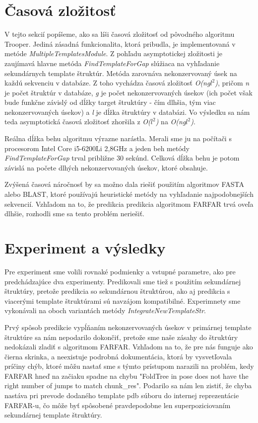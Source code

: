 \section{Časová zložitosť} 
V tejto sekcií popíšeme, ako sa líši časová zložitosť od pôvodného algoritmu Trooper. Jediná zásadná funkcionalita, ktorá pribudla, je implementovaná v metóde \textit{MultipleTemplatesModule}.
Z pohľadu asymptotickej zložitosti je zaujímavá hlavne metóda  \textit{FindTemplateForGap} slúžiaca na vyhľadanie sekundárnych template štruktúr. Metóda zarovnáva nekonzervovaný úsek na každú sekvenciu v databáze. Z toho vychádza časová zložitosť \textit{O(ng$l^2$)}, pričom \textit{n} je počet štruktúr v databáze, \textit{g} je počet nekonzervovaných úsekov (ich počet však bude funkčne závislý od dĺžky target štruktúry - čím dlhšia, tým viac nekonzervovaných úsekov)  a \textit{l} je dĺžka štruktúry v databázi. Vo výsledku sa nám teda asymptotická časová zložitosť zhoršila z \textit{O($l^2$)} na \textit{O(ng$l^2$)}.


\indent Reálna dĺžka behu algoritmu výrazne narástla. Merali sme ju na počítači s procesorom Intel Core i5-6200Li 2,8GHz a jeden beh metódy \textit{FindTemplateForGap} trval približne 30 sekúnd. Celková dĺžka behu je potom závislá na počete dlhých nekonzervovaných úsekov, ktoré obsahuje. 


\indent Zvýšená časová náročnosť by sa možno dala riešiť použitím algoritmov FASTA alebo BLAST, ktoré používajú heuristické metódy na vyhľadanie najpodobnejších sekvencií. Vzhľadom na to, že predikcia predikcia algoritmom FARFAR trvá oveľa dlhšie, rozhodli sme sa tento problém neriešiť.


\section{Experiment a výsledky} 
Pre experiment sme volili rovnaké podmienky a vstupné parametre, ako pre predchádzajúce dva experimenty. Predikovali sme tiež s použitím sekundárnej štruktúry, pretože predikcia so sekundárnou štruktúrou, ako aj predikcia s viacerými template štruktúrami sú navzájom kompatibilné. Experimnety sme vykonávali na oboch variantách metódy \textit{IntegrateNewTemplateStr}.


\indent Prvý spôsob predikcie vypĺňaním nekonzervovaných úsekov v primárnej template štruktúre sa nám nepodarilo dokončiť, pretože sme naše zásahy do štruktúry nedokázali zladiť s algoritmom FARFAR. Vzhľadom na to, že pre nás funguje ako čierna skrinka, a neexistuje podrobná dokumentácia, ktorá by vysvetľovala príčiny chýb, ktoré môžu nastať sme s týmto prístupom narazili na problém, kedy FARFAR hneď na začiaku spadne na chybu "FoldTree in pose does not have the right number of jumps to match chunk\_res". Podarilo sa nám len zistiť, že chyba nastáva pri prevode dodaného template pdb súboru do internej reprezentácie FARFAR-u, čo môže byť spôsobené pravdepodobne len superpoziciovaním sekundárnej template štruktúry.



